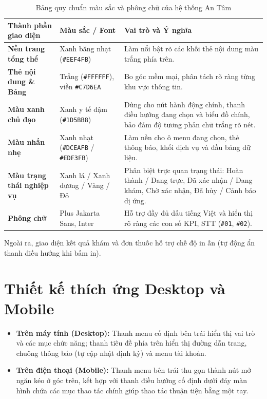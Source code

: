 \documentclass[12pt,a4paper]{report}
\begin{document}
\begin{table}[H]
  \centering
  \caption{Bảng quy chuẩn màu sắc và phông chữ của hệ thống An Tâm}
  \label{tab:design-tokens}
  \begin{tabularx}{\textwidth}{@{}p{4.3cm} p{3.6cm} X@{}}
    \toprule
    \textbf{Thành phần giao diện} & \textbf{Màu sắc / Font} & \textbf{Vai trò và Ý nghĩa} \\
    \midrule
    \textbf{Nền trang tổng thể} & Xanh băng nhạt (\texttt{\#EEF4FB}) & Làm nổi bật rõ các khối thẻ nội dung màu trắng phía trên. \\
    \textbf{Thẻ nội dung \& Bảng} & Trắng (\texttt{\#FFFFFF}), viền \texttt{\#C7D6EA} & Bo góc mềm mại, phân tách rõ ràng từng khu vực thông tin. \\
    \textbf{Màu xanh chủ đạo} & Xanh y tế đậm (\texttt{\#1D5BB8}) & Dùng cho nút hành động chính, thanh điều hướng đang chọn và biểu đồ chính, bảo đảm độ tương phản chữ trắng rõ nét. \\
    \textbf{Màu nhấn nhẹ} & Xanh nhạt (\texttt{\#DCEAFB} / \texttt{\#EDF3FB}) & Làm nền cho ô menu đang chọn, thẻ thông báo, khối dịch vụ và đầu bảng dữ liệu. \\
    \textbf{Màu trạng thái nghiệp vụ} & Xanh lá / Xanh dương / Vàng / Đỏ & Phân biệt trực quan trạng thái: Hoàn thành / Đang trực, Đã xác nhận / Đang khám, Chờ xác nhận, Đã hủy / Cảnh báo dị ứng. \\
    \textbf{Phông chữ} & Plus Jakarta Sans, Inter & Hỗ trợ đầy đủ dấu tiếng Việt và hiển thị rõ ràng các con số KPI, STT (\texttt{\#01}, \texttt{\#02}). \\
    \bottomrule
  \end{tabularx}
\end{table}

Ngoài ra, giao diện kết quả khám và đơn thuốc hỗ trợ chế độ in ấn (tự động ẩn thanh điều hướng khi bấm in).

\section{Thiết kế thích ứng Desktop và Mobile}
\begin{itemize}
  \item \textbf{Trên máy tính (Desktop):} Thanh menu cố định bên trái hiển thị vai trò và các mục chức năng; thanh tiêu đề phía trên hiển thị đường dẫn trang, chuông thông báo (tự cập nhật định kỳ) và menu tài khoản.
  \item \textbf{Trên điện thoại (Mobile):} Thanh menu bên trái thu gọn thành nút mở ngăn kéo ở góc trên, kết hợp với thanh điều hướng cố định dưới đáy màn hình chứa các mục thao tác chính giúp thao tác thuận tiện bằng một tay.
\end{itemize}
\end{document}
